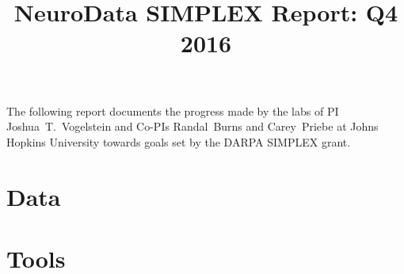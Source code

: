 \documentclass[12pt]{article}
\title{NeuroData SIMPLEX Report: Q4 2016}
\begin{document}
\renewcommand{\onlyinsubfile}[1]{}
\renewcommand{\notinsubfile}[1]{#1}
\maketitle
\thispagestyle{empty}

The following report documents the progress made by the labs of PI Joshua~T.~Vogelstein and Co-PIs Randal~Burns and Carey~Priebe at Johns Hopkins University towards goals set by the DARPA SIMPLEX grant.

\setcounter{tocdepth}{2}
\tableofcontents


\newpage 
\begin{spacing}{0.5}
{\footnotesize
{}
 
 
}
\end{spacing}

\newpage 
\section{Data}

%


\newpage
\section{Tools}

%























\newpage
\begin{spacing}{0.5}
{\footnotesize
}
\end{spacing}

\end{document}
